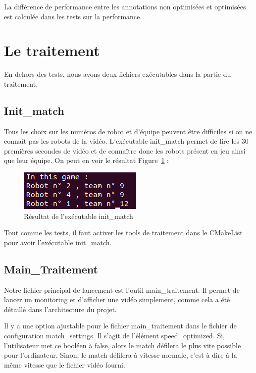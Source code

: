 La différence de performance entre les annotations non optimisées et optimisées est calculée dans les tests sur la performance.

\section{Le traitement}

En dehors des tests, nous avons deux fichiers exécutables dans la partie du traitement.

\subsection{Init\_match}


Tous les choix sur les numéros de robot et d'équipe peuvent être difficiles si on ne connaît pas les robots de la vidéo. 
L'exécutable init\_match permet de lire les 30 premières secondes de vidéo et de connaître donc les robots présent en jeu ainsi que leur équipe. On peut en voir le résultat Figure~\ref{fig:init_match} :

\begin{figure}[h] 
\centering 
\includegraphics[scale = 0.5]{images/init_match.png}
    \caption{Résultat de l'exécutable init\_match}
    \label{fig:init_match}
\end{figure}


Tout comme les tests, il faut activer les tools de traitement dans le CMakeList pour avoir l'exécutable init\_match.

\subsection{Main\_Traitement}

Notre fichier principal de lancement est l'outil main\_traitement.
Il permet de lancer un monitoring et d'afficher une vidéo simplement, comme cela a été détaillé dans l'architecture du projet.
\bigskip

Il y a une option ajustable pour le fichier main\_traitement dans le fichier de configuration match\_settings. Il s'agit de l'élément speed\_optimized. Si, l'utilisateur met ce booléen à false, alors le match défilera le plus vite possible pour l'ordinateur.
Sinon, le match défilera à vitesse normale, c'est à dire à la même vitesse que le fichier vidéo fourni.
\bigskip

